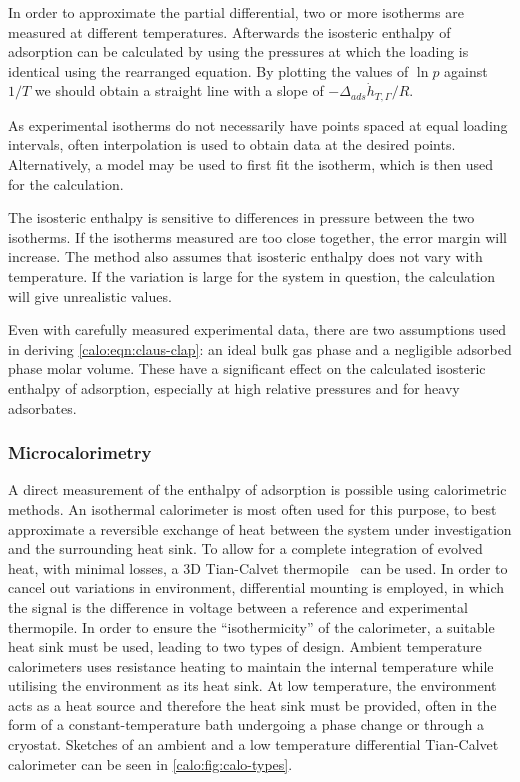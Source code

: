 In order to approximate the partial differential, two or more
isotherms are measured at different temperatures. 
Afterwards the isosteric enthalpy of adsorption can be calculated
by using the pressures at which the loading is identical using the 
rearranged equation. By plotting the values of \(\ln p\) against
\(1 / T\) we should obtain a straight line with a slope
of \(- \Delta_{ads}\dot{h}_{T, \Gamma} / R\).

As experimental isotherms do not necessarily have points spaced 
at equal loading intervals, often interpolation is used to obtain
data at the desired points. Alternatively, a model may be used 
to first fit the isotherm, which is then used for the calculation.

The isosteric enthalpy is sensitive to differences in pressure between
the two isotherms. If the isotherms measured are too close together, 
the error margin will increase. The method also assumes that isosteric
enthalpy does not vary with temperature. If the
variation is large for the system in question, the calculation will
give unrealistic values.

Even with carefully measured experimental data, there are two 
assumptions used in deriving \autoref{calo:eqn:claus-clap}: 
an ideal bulk gas phase and a negligible adsorbed phase
molar volume. These have a significant effect on the calculated 
isosteric enthalpy of adsorption, especially at high relative pressures 
and for heavy adsorbates.

\subsubsection{Microcalorimetry}

A direct measurement of the enthalpy of adsorption is possible using
calorimetric methods.
An isothermal calorimeter is most often used for this purpose, 
to best approximate a reversible exchange of heat between the 
system under investigation and the surrounding 
heat sink. To allow for a complete integration of evolved heat,
with minimal losses, a 3D Tian-Calvet thermopile~\cite{calvetRecentProgressMicrocalorimetry1963}
can be used. In order to cancel out variations in environment,
differential mounting is employed, in which the signal 
is the difference in voltage between a reference and experimental
thermopile. In order to ensure the ``isothermicity'' of the calorimeter, a 
suitable heat sink must be used, leading to two types of design. 
Ambient temperature calorimeters uses resistance heating to
maintain the internal temperature while utilising the environment 
as its heat sink. At low temperature, the
environment acts as a heat source and therefore the heat sink must 
be provided, often in the form of a constant-temperature bath
undergoing a phase change or through a cryostat. Sketches of 
an ambient and a low temperature differential Tian-Calvet calorimeter
can be seen in \autoref{calo:fig:calo-types}.

